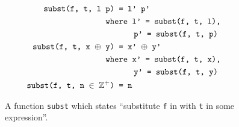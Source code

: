 \begin{figure}[p]
\begin{mdframed}
\begin{align}
			\texttt{subst(f, t, l p) }                           & \texttt{= l' p'}\tag*{}                      \\
			\texttt{whe}&\texttt{re l' = subst(f, t, l),}\tag*{}                                                             \\
			&\hspace{0.62cm}\texttt{p' = subst(f, t, p)}\tag*{}                                                              \\
			\texttt{subst(f, t, x $\oplus$ y) }                  & \texttt{= x' $\oplus$ y'}\tag*{}             \\
			\texttt{whe}&\texttt{re x' = subst(f, t, x),}\tag*{}                                                             \\
			&\hspace{0.62cm}\texttt{y' = subst(f, t, y)}\tag*{}                                                              \\
			\texttt{subst(f, t, n $\in$ $\mathbb{Z}^+$) }        & \texttt{= n}\tag*{}
		\end{align}
	\end{mdframed}
	\caption{A function \texttt{subst} which states ``substitute \texttt{f} in with \texttt{t} in some expression''.}
	\label{fig:eval:subst}
\end{figure}

